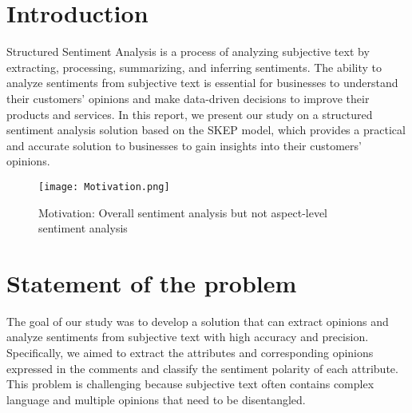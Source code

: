 \section{Introduction}

Structured Sentiment Analysis is a process of analyzing subjective text by extracting, processing, summarizing, and inferring sentiments. The ability to analyze sentiments from subjective text is essential for businesses to understand their customers' opinions and make data-driven decisions to improve their products and services. In this report, we present our study on a structured sentiment analysis solution based on the SKEP model, which provides a practical and accurate solution to businesses to gain insights into their customers' opinions.

\begin{figure}[h]
    \centering
    \texttt{[image: Motivation.png]}
    \caption{Motivation: Overall sentiment analysis but not aspect-level sentiment analysis}
    \label{fig:Motivation}
\end{figure}

\section{Statement of the problem}
The goal of our study was to develop a solution that can extract opinions and analyze sentiments from subjective text with high accuracy and precision. Specifically, we aimed to extract the attributes and corresponding opinions expressed in the comments and classify the sentiment polarity of each attribute. This problem is challenging because subjective text often contains complex language and multiple opinions that need to be disentangled.
